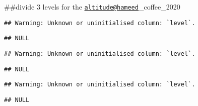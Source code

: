 \documentclass[
]{article}
\newenvironment{Shaded}{\begin{snugshade}}{\end{snugshade}}
\newcommand{\DecValTok}[1]{\textcolor[rgb]{0.00,0.00,0.81}{#1}}
\newcommand{\NormalTok}[1]{#1}
\newcommand{\SpecialCharTok}[1]{\textcolor[rgb]{0.00,0.00,0.00}{#1}}
\begin{document}
\#\#divide 3 levels for the
\href{mailto:altitude@hameed}{\nolinkurl{altitude@hameed}}\_coffee\_2020

\begin{Shaded}
\end{Shaded}

\begin{verbatim}
## Warning: Unknown or uninitialised column: `level`.
\end{verbatim}

\begin{verbatim}
## NULL
\end{verbatim}

\begin{Shaded}
\end{Shaded}

\begin{verbatim}
## Warning: Unknown or uninitialised column: `level`.
\end{verbatim}

\begin{verbatim}
## NULL
\end{verbatim}

\begin{Shaded}
\end{Shaded}

\begin{verbatim}
## Warning: Unknown or uninitialised column: `level`.
\end{verbatim}

\begin{verbatim}
## NULL
\end{verbatim}
\end{document}
